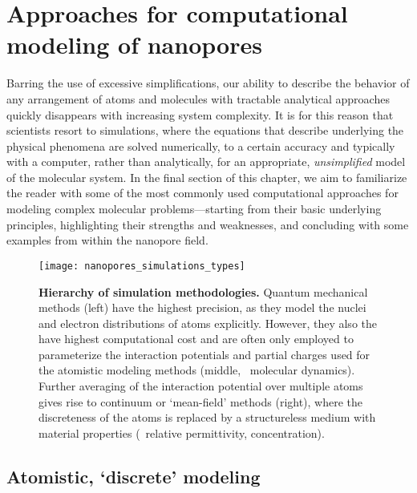 %
%
%
%


\section{Approaches for computational modeling of nanopores}
%
\label{sec:np:modeling}
%

Barring the use of excessive simplifications, our ability to describe the behavior of any arrangement of atoms
and molecules with tractable analytical approaches quickly disappears with increasing system complexity. It is
for this reason that scientists resort to simulations, where the equations that describe underlying the
physical phenomena are solved numerically, to a certain accuracy and typically with a computer, rather than
analytically, for an appropriate, \emph{unsimplified} model of the molecular system. In the final section of
this chapter, we aim to familiarize the reader with some of the most commonly used computational approaches
for modeling complex molecular problems---starting from their basic underlying principles, highlighting their
strengths and weaknesses, and concluding with some examples from within the nanopore field.

%
\begin{figure*}[b]
  \centering
  
  \texttt{[image: nanopores\_simulations\_types]}

\caption[Hierarchy of simulation methodologies]{%
  \textbf{Hierarchy of simulation methodologies.}
  Quantum mechanical methods (left) have the highest precision, as they model the nuclei and electron
  distributions of atoms explicitly. However, they also the have highest computational cost and are often
  only employed to parameterize the interaction potentials and partial charges used for the atomistic modeling
  methods (middle, \eg~molecular dynamics). Further averaging of the interaction potential over multiple atoms
  gives rise to continuum or `mean-field' methods (right), where the discreteness of the atoms is replaced by
  a structureless medium with material properties (\eg~relative permittivity, concentration).
  }\label{fig:nanopores_simulations_types}
\end{figure*}
%



\subsection{Atomistic, `discrete' modeling}
%

